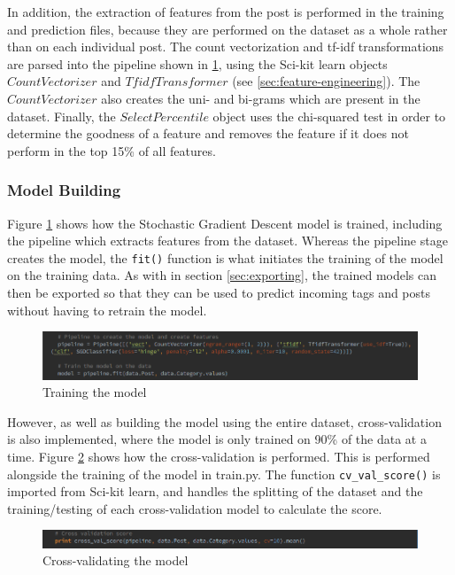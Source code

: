 In addition, the extraction of features from the post is performed in the training and prediction files, because they are performed on the dataset as a whole rather than on each individual post. The count vectorization and tf-idf transformations are parsed into the pipeline shown in \ref{fig:imp-content-train}, using the Sci-kit learn objects $CountVectorizer$ and $TfidfTransformer$ (see \ref{sec:feature-engineering}). The $CountVectorizer$ also creates the uni- and bi-grams which are present in the dataset. Finally, the $SelectPercentile$ object uses the chi-squared test in order to determine the goodness of a feature and removes the feature if it does not perform in the top 15\% of all features.

\subsubsection{Model Building}
Figure \ref{fig:imp-content-train} shows how the Stochastic Gradient Descent model is trained, including the pipeline which extracts features from the dataset. Whereas the pipeline stage creates the model, the \texttt{fit()} function is what initiates the training of the model on the training data. As with in section \ref{sec:exporting}, the trained models can then be exported so that they can be used to predict incoming tags and posts without having to retrain the model.

\begin{figure}[H]
\centering
\includegraphics[width=\textwidth]{Images/Implementation/content-train}
\caption{Training the model}
\label{fig:imp-content-train}
\end{figure}

However, as well as building the model using the entire dataset, cross-validation is also implemented, where the model is only trained on 90\% of the data at a time. Figure \ref{fig:content-cv} shows how the cross-validation is performed. This is performed alongside the training of the model in train.py. The function \texttt{cv\_val\_score()} is imported from Sci-kit learn, and handles the splitting of the dataset and the training/testing of each cross-validation model to calculate the score.

\begin{figure}[H]
\centering
\includegraphics[width=\textwidth]{Images/Implementation/content-cv}
\caption{Cross-validating the model}
\label{fig:content-cv}
\end{figure}

